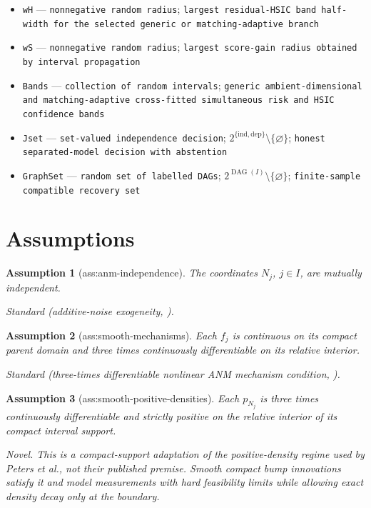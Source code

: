 \documentclass{article}
\newtheorem{assumption}{Assumption}
\begin{document}
\begin{itemize}
  \item \texttt{wH} --- \texttt{nonnegative random radius}; \texttt{largest residual-\allowbreak{}HSIC band half-\allowbreak{}width for the selected generic or matching-\allowbreak{}adaptive branch}
  \item \texttt{wS} --- \texttt{nonnegative random radius}; \texttt{largest score-\allowbreak{}gain radius obtained by interval propagation}
  \item \texttt{Bands} --- \texttt{collection of random intervals}; \texttt{generic ambient-\allowbreak{}dimensional and matching-\allowbreak{}adaptive cross-\allowbreak{}fitted simultaneous risk and HSIC confidence bands}
  \item \texttt{Jset} --- \texttt{set-\allowbreak{}valued independence decision}; \(2^{\{\mathrm{ind},\mathrm{dep}\}}\setminus\{\varnothing\}\); \texttt{honest separated-\allowbreak{}model decision with abstention}
  \item \texttt{GraphSet} --- \texttt{random set of labelled DAGs}; \(2^{\operatorname{DAG}(I)}\setminus\{\varnothing\}\); \texttt{finite-\allowbreak{}sample compatible recovery set}
\end{itemize}

\section{Assumptions}

\begin{assumption}[ass:anm-independence]\label{ass:anm-independence}
The coordinates \(N_j\), \(j\in I\), are mutually independent.
\par\smallskip\noindent\emph{Standard} (additive-noise exogeneity, \cite{peters14a}).
\end{assumption}

\begin{assumption}[ass:smooth-mechanisms]\label{ass:smooth-mechanisms}
Each \(f_j\) is continuous on its compact parent domain and three times continuously differentiable on its relative interior.
\par\smallskip\noindent\emph{Standard} (three-times differentiable nonlinear ANM mechanism condition, \cite{peters14a}).
\end{assumption}

\begin{assumption}[ass:smooth-positive-densities]\label{ass:smooth-positive-densities}
Each \(p_{N_j}\) is three times continuously differentiable and strictly positive on the relative interior of its compact interval support.
\par\smallskip\noindent\emph{Novel.} This is a compact-support adaptation of the positive-density regime used by Peters et al., not their published premise. Smooth compact bump innovations satisfy it and model measurements with hard feasibility limits while allowing exact density decay only at the boundary.
\end{assumption}
\end{document}
